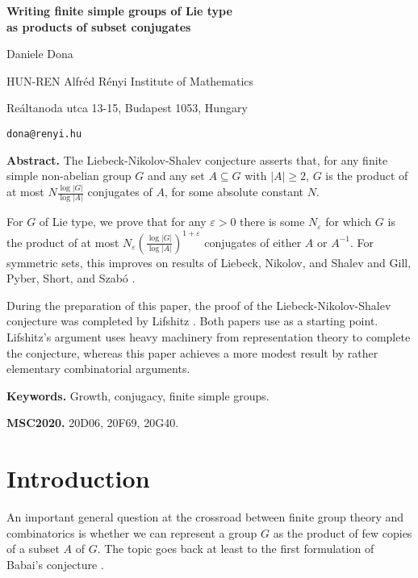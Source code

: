 \documentclass[a4paper]{article}
\theoremstyle{definition}
\numberwithin{equation}{section}
\begin{document}
\begin{center}
\LARGE
\textbf{Writing finite simple groups of Lie type \\ as products of subset conjugates}
\bigskip\bigskip

\large
Daniele Dona
\bigskip

\normalsize
HUN-REN Alfr\'ed R\'enyi Institute of Mathematics

Re\'altanoda utca 13-15, Budapest 1053, Hungary

\texttt{dona@renyi.hu}
\bigskip\medskip
\end{center}

\begin{minipage}{110mm}
\small
\textbf{Abstract.} The Liebeck-Nikolov-Shalev conjecture \cite{LNS12} asserts that, for any finite simple non-abelian group $G$ and any set $A\subseteq G$ with $|A|\geq 2$, $G$ is the product of at most $N\frac{\log|G|}{\log|A|}$ conjugates of $A$, for some absolute constant $N$.

For $G$ of Lie type, we prove that for any $\varepsilon>0$ there is some $N_{\varepsilon}$ for which $G$ is the product of at most $N_{\varepsilon}\left(\frac{\log|G|}{\log|A|}\right)^{1+\varepsilon}$ conjugates of either $A$ or $A^{-1}$. For symmetric sets, this improves on results of Liebeck, Nikolov, and Shalev \cite{LNS12} and Gill, Pyber, Short, and Szab\'o \cite{GPSS13}.

During the preparation of this paper, the proof of the Liebeck-Nikolov-Shalev conjecture was completed by Lifshitz \cite{Lif24}. Both papers use \cite{GLPS24} as a starting point. Lifshitz's argument uses heavy machinery from representation theory to complete the conjecture, whereas this paper achieves a more modest result by rather elementary combinatorial arguments.
\medskip

\textbf{Keywords.} Growth, conjugacy, finite simple groups.
\medskip

\textbf{MSC2020.} 20D06, 20F69, 20G40.
\end{minipage}
\medskip

\section{Introduction}

An important general question at the crossroad between finite group theory and combinatorics is whether we can represent a group $G$ as the product of few copies of a subset $A$ of $G$. The topic goes back at least to the first formulation of Babai's conjecture \cite{BS88}.
\end{document}
